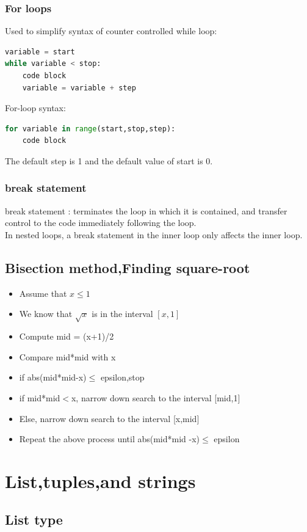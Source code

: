 \documentclass[12pt,oneside]{book}
\begin{document}
\subsection{For loops}
Used to simplify syntax of counter controlled while loop:
\begin{lstlisting}[language=python]
variable = start 
while variable < stop:
	code block 
	variable = variable + step
\end{lstlisting}
For-loop syntax:
\begin{lstlisting}[language=python]
for variable in range(start,stop,step):
	code block
\end{lstlisting}
The default step is 1 and the default value of start is 0.
\subsection{break statement}
break statement : terminates the loop in which it is contained, and transfer control to the code immediately following the loop.\\
In nested loops, a break statement in the inner loop only affects the inner loop.\\
\section{Bisection method,Finding square-root}
\begin{itemize}
	\item Assume that $ x \leq 1 $
	\item We know that $\sqrt{x}$ is in the interval $[x,1]$
	\item Compute mid = (x+1)/2
	\item Compare mid*mid with x
	\item if abs(mid*mid-x)$\leq$ epsilon,stop
	\item if mid*mid$<$x, narrow down search to the interval [mid,1]
	\item Else, narrow down search to the interval [x,mid]
	\item Repeat the above process until abs(mid*mid -x)$\leq$ epsilon
\end{itemize}




\chapter{List,tuples,and strings}
\section{List type}
\end{document}
